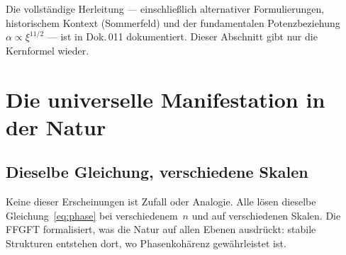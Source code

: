 \begin{warnbox}
Die vollständige Herleitung — einschließlich alternativer Formulierungen,
historischem Kontext (Sommerfeld) und der fundamentalen Potenzbeziehung
$\alpha \propto \xi^{11/2}$ — ist in Dok.\,011 dokumentiert.
Dieser Abschnitt gibt nur die Kernformel wieder.
\end{warnbox}

\section{Die universelle Manifestation in der Natur}

\subsection{Dieselbe Gleichung, verschiedene Skalen}

\begin{table}[H]
\centering
\caption{Manifestation der Phasenbedingung auf verschiedenen Skalen}
\smallskip
{}
\end{table}

\begin{keybox}
Keine dieser Erscheinungen ist Zufall oder Analogie. Alle lösen
dieselbe Gleichung~\eqref{eq:phase} bei verschiedenem~$n$
und auf verschiedenen Skalen. Die FFGFT formalisiert, was die Natur
auf allen Ebenen ausdrückt: stabile Strukturen entstehen dort, wo
Phasenkohärenz gewährleistet ist.
\end{keybox}

